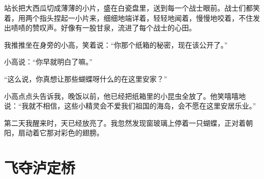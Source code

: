 \documentclass[12pt,UTF-8,openany]{ctexbook}
\begin{document}
\begin{Large}
    站长把大西瓜切成薄薄的小片，盛在白瓷盘里，送到每一个战士眼前。战士们都笑着，用两个指头捏起一小片来，细细地端详着，轻轻地闻着，慢慢地咬着，不住发出啧啧的赞叹声。好像有一股甘泉，流进了每个战士的心田。
    
    我推推坐在身旁的小高，笑着说：“你那个纸箱的秘密，现在该公开了。”
    
    小高说：“你早就明白了嘛。”
    
    “这么说，你真想让那些蝴蝶呀什么的在这里安家？”
    
    小高点点头告诉我，晚饭以前，他已经把纸箱里的小昆虫全放了。他笑嘻嘻地说：“我就不相信，这些小精灵会不爱我们祖国的海岛，会不愿在这里安居乐业。”
    
    第二天我醒来时，天已经放亮了。我忽然发现窗玻璃上停着一只蝴蝶，正对着朝阳，扇动着它那对彩色的翅膀。
    
\end{Large}

\chapter{飞夺泸定桥}
\end{document}
